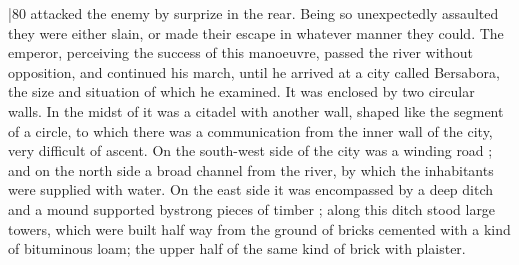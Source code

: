 |80 attacked the enemy by surprize in the rear. Being so unexpectedly assaulted they were either slain, or made their escape in whatever manner they could. The emperor, perceiving the success of this manoeuvre, passed the river without opposition, and continued his march, until he arrived at a city called Bersabora, the size and situation of which he examined. It was enclosed by two circular walls. In the midst of it was a citadel with another wall, shaped like the segment of a circle, to which there was a communication from the inner wall of the city, very difficult of ascent. On the south-west side of the city was a winding road ; and on the north side a broad channel from the river, by which the inhabitants were supplied with water. On the east side it was encompassed by a deep ditch and a mound supported by\emph{}strong pieces of timber ; along this ditch stood large towers, which were built half way from the ground of bricks cemented with a kind of bituminous loam; the upper half of the same kind of brick with plaister.

